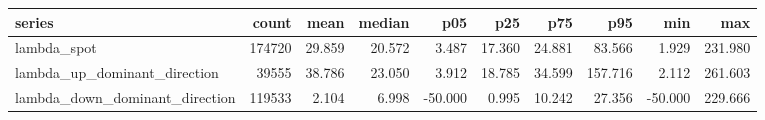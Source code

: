\begin{tabular}{lrrrrrrrrr}
\toprule
series & count & mean & median & p05 & p25 & p75 & p95 & min & max \\
\midrule
lambda_spot & 174720 & 29.859 & 20.572 & 3.487 & 17.360 & 24.881 & 83.566 & 1.929 & 231.980 \\
lambda_up_dominant_direction & 39555 & 38.786 & 23.050 & 3.912 & 18.785 & 34.599 & 157.716 & 2.112 & 261.603 \\
lambda_down_dominant_direction & 119533 & 2.104 & 6.998 & -50.000 & 0.995 & 10.242 & 27.356 & -50.000 & 229.666 \\
\bottomrule
\end{tabular}
